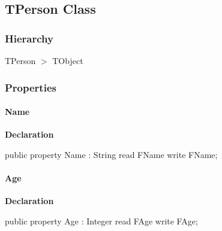 \documentclass{report}
\begin{document}
\subsection*{TPerson Class}
\subsubsection*{\large{\textbf{Hierarchy}}\normalsize\hspace{1ex}\hfill}
TPerson {$>$} TObject
\subsubsection*{\large{\textbf{Properties}}\normalsize\hspace{1ex}\hfill}
\paragraph*{Name}\hspace*{\fill}

\begin{list}{}{
\setlength{\itemindent}{0cm}
\setlength{\listparindent}{0cm}
\setlength{\leftmargin}{\evensidemargin}
\addtolength{\leftmargin}{\tmplength}
\settowidth{\labelsep}{X}
\addtolength{\leftmargin}{\labelsep}
\setlength{\labelwidth}{\tmplength}
}
\begin{flushleft}
\item[\textbf{Declaration}\hfill]
\begin{ttfamily}
public property Name : String read FName write FName;\end{ttfamily}


\end{flushleft}
\end{list}
\paragraph*{Age}\hspace*{\fill}

\begin{list}{}{
\setlength{\itemindent}{0cm}
\setlength{\listparindent}{0cm}
\setlength{\leftmargin}{\evensidemargin}
\addtolength{\leftmargin}{\tmplength}
\settowidth{\labelsep}{X}
\addtolength{\leftmargin}{\labelsep}
\setlength{\labelwidth}{\tmplength}
}
\begin{flushleft}
\item[\textbf{Declaration}\hfill]
\begin{ttfamily}
public property Age : Integer read FAge write FAge;\end{ttfamily}


\end{flushleft}
\end{list}
\end{document}
